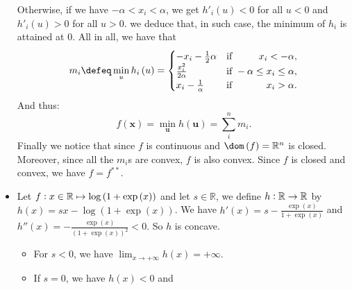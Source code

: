 \documentclass{article}
\begin{document}
\begin{itemize}
           Otherwise, if we have
           $-\alpha < x_{i} < \alpha$,
           we get $h'_{i}\left(u\right) < 0$ 
           for all $u < 0$ and
           $h'_{i}\left(u\right) > 0$ 
           for all $u > 0$.
           we deduce that, in such case,
           the minimum of $h_{i}$
           is attained at $0$.
           All in all, we have that
           \begin{equation*}
               m_{i} \defeq \min_{u} h_{i}\left(u\right)
               = 
               \begin{cases}
                   -x_{i} - \frac{1}{2}\alpha &\text{if } \hfill x_{i} < -\alpha, \\
                   \frac{x_{i}^{2}}{2 \alpha} &\text{if }\hfill -\alpha \leq x_{i} \leq \alpha, \\
                   x_{i} - \frac{1}{\alpha} &\text{if } \hfill x_{i} > \alpha.\\
               \end{cases}
           \end{equation*}
           And thus:
           \begin{equation*}
               f\left(\mathbf{x}\right) = 
               \min_{\mathbf{u}} h\left(\mathbf{u}\right) = 
               \sum_{i}^{n} m_{i}.
           \end{equation*}
           Finally we notice that since
           $f$ is continuous and $\dom\left(f\right) = \mathbb{R}^{n}$
           is closed.
           Moreover, since
           all the $m_{i}$s are convex,
           $f$ is also convex.
           Since $f$ is closed and
           convex,
           we have $f = f^{**}$.
       \item Let $f \vcentcolon x \in \mathbb{R} \mapsto 
           \log\left(1 + \exp\left(x\right)\right)$ and
           let $s \in \mathbb{R}$,
           we define $h \vcentcolon \mathbb{R} \rightarrow \mathbb{R}$
           by $h\left(x\right) = sx - \log\left(1 + \exp\left(x\right)\right)$.
           We have $h'\left(x\right) = s - \frac{\exp\left(x\right)}{1 + \exp\left(x\right)}$ 
           and $h''\left(x\right) = - \frac{\exp\left(x\right)}{\left(1 + \exp\left(x\right)\right)^{2}}<0$.
           So $h$ is concave.
           \begin{itemize}
               \item For $s < 0$, we have
                   $\lim_{x \rightarrow +\infty} h\left(x\right) = +\infty$.
               \item If $s = 0$, we have
                   $h\left(x\right) < 0$ and

\end{itemize}
\end{itemize}
\end{document}
